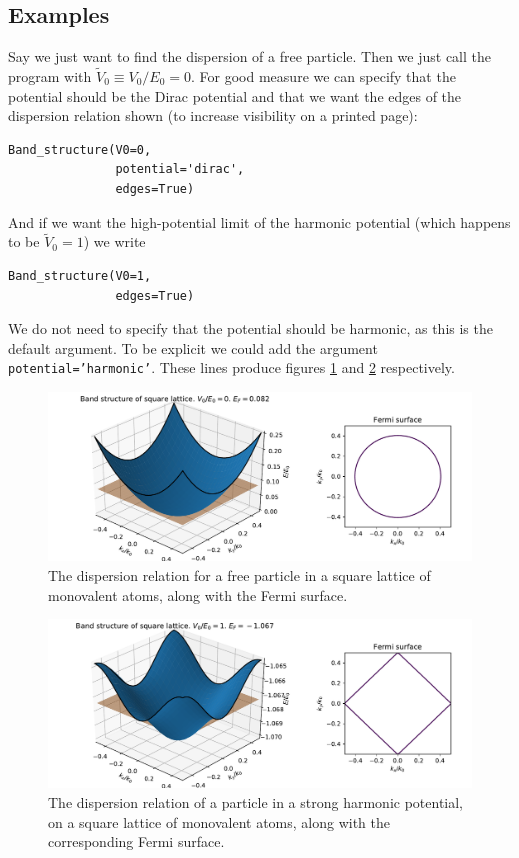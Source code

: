 \documentclass[main.tex]{subfiles}
\begin{document}
	\subsection{Examples}
	Say we just want to find the dispersion of a free particle. Then we just call the program with $ \tilde{V}_0 \equiv V_0/E_0 = 0 $. For good measure we can specify that the potential should be the Dirac potential and that we want the edges of the dispersion relation shown (to increase visibility on a printed page):
\begin{lstlisting}
Band_structure(V0=0,
			   potential='dirac',
			   edges=True)
\end{lstlisting}
	And if we want the high-potential limit of the harmonic potential (which happens to be $ \tilde{V}_0 = 1 $) we write
\begin{lstlisting}
Band_structure(V0=1,
			   edges=True)
\end{lstlisting}
	We do not need to specify that the potential should be harmonic, as this is the default argument. To be explicit we could add the argument \texttt{potential='harmonic'}.	These lines produce figures \ref{fig:band_structure_none} and \ref{fig:band_structure_strong} respectively.
	\begin{figure}[h]
		\centering
		\includegraphics[width=\linewidth]{figures/band_structure_none.pdf}
		\caption{The dispersion relation for a free particle in a square lattice of monovalent atoms, along with the Fermi surface.}
		\label{fig:band_structure_none}
	\end{figure}

	\begin{figure}[h]
		\centering
		\includegraphics[width=\linewidth]{figures/band_structure_strong.pdf}
		\caption{The dispersion relation of a particle in a strong harmonic potential, on a square lattice of monovalent atoms, along with the corresponding Fermi surface.}
		\label{fig:band_structure_strong}
	\end{figure}
\end{document}
